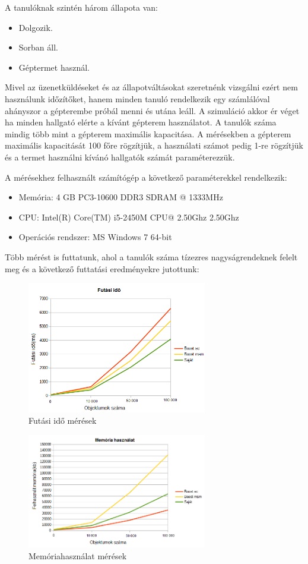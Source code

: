 \documentclass[a4paper,12pt]{report}
\begin{document}
A tanulóknak szintén három állapota van:
\begin{itemize}
\item Dolgozik.
\item Sorban áll.
\item Géptermet használ.
\end{itemize}
Mivel az üzenetküldéseket és az állapotváltásokat szeretnénk vizsgálni ezért nem használunk időzítőket, hanem minden tanuló rendelkezik egy számlálóval ahányszor a gépterembe próbál menni és utána leáll. A szimuláció akkor ér véget ha minden hallgató elérte a kívánt gépterem használatot. A tanulók száma mindig több mint a gépterem maximális kapacitása. A mérésekben a gépterem maximális kapacitását 100 főre rögzítjük, a használati számot pedig 1-re rögzítjük és a termet használni kívánó hallgatók számát paraméterezzük. 

A mérésekhez felhasznált számítógép a következő paraméterekkel rendelkezik:
\begin{itemize}
\item Memória: 4 GB PC3-10600 DDR3 SDRAM @ 1333MHz
\item CPU: Intel(R) Core(TM) i5-2450M CPU@ 2.50Ghz 2.50Ghz
\item Operációs rendszer: MS Windows 7 64-bit
\end{itemize}

Több mérést is futtatunk, ahol a tanulók száma tízezres nagyságrendeknek felelt meg és a következő futtatási eredményekre jutottunk: 

\begin{figure}[hbtp]
\centering
\includegraphics[width=0.7\textwidth]{futasido.png}
\caption{Futási idő mérések}
\label{fig:ftgs}
\end{figure}

\begin{figure}[hbtp]
\centering
\includegraphics[width=0.7\textwidth]{memoria.png}
\caption{Memóriahasználat mérések}
\label{fig:ws}
\end{figure}
\end{document}
